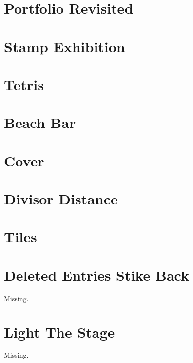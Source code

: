 \documentclass[a4paper, 10pt]{article}
\let\stdsection\section
\renewcommand\section{\newpage\stdsection}
\newcommand{\includecode}[1]{
    }
\begin{document}
    \section{Portfolio Revisited}
        \includecode{../problems/w10/Portfolios_Revisited/PortfolioRevisited1.cpp}
        
    \section{Stamp Exhibition}
        \includecode{../problems/w10/Stamp_Exhibition/Stamps1.cpp}
        
    \section{Tetris}
        \includecode{../problems/w10/Tetris/Tetris1.cpp}
 
    
    \section{Beach Bar}
        \includecode{../problems/w11/Beach_Bar/BeachBar1.cpp}
        
    \section{Cover}
        \includecode{../problems/w11/Cover/Cover1.cpp}
        
    \section{Divisor Distance}
        \includecode{../problems/w11/Divisor_Distance/DivisorDistance1.cpp}
        
    \section{Tiles}
        \includecode{../problems/w11/Tiles/Tiles1.cpp}
        
    
    \section{Deleted Entries Stike Back}
        Missing.
        
    \section{Light The Stage}
        Missing.
        
\end{document}
